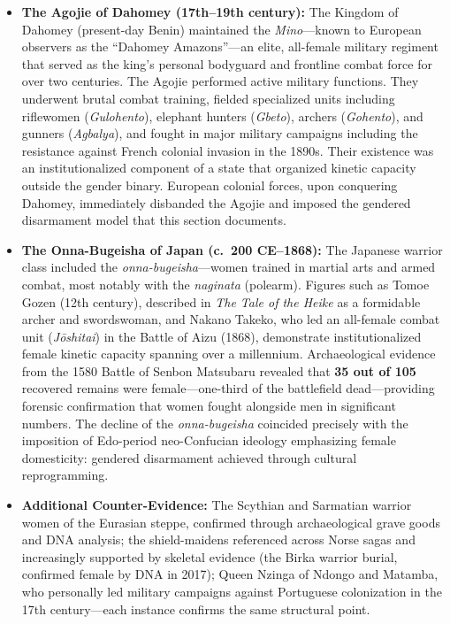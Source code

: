 \begin{itemize}
    \item \textbf{The Agojie of Dahomey (17th--19th century):} The Kingdom of Dahomey (present-day Benin) maintained the \textit{Mino}---known to European observers as the ``Dahomey Amazons''---an elite, all-female military regiment that served as the king's personal bodyguard and frontline combat force for over two centuries. The Agojie performed active military functions. They underwent brutal combat training, fielded specialized units including riflewomen (\textit{Gulohento}), elephant hunters (\textit{Gbeto}), archers (\textit{Gohento}), and gunners (\textit{Agbalya}), and fought in major military campaigns including the resistance against French colonial invasion in the 1890s. Their existence was an institutionalized component of a state that organized kinetic capacity outside the gender binary. European colonial forces, upon conquering Dahomey, immediately disbanded the Agojie and imposed the gendered disarmament model that this section documents.

    \item \textbf{The Onna-Bugeisha of Japan (c.\ 200 CE--1868):} The Japanese warrior class included the \textit{onna-bugeisha}---women trained in martial arts and armed combat, most notably with the \textit{naginata} (polearm). Figures such as Tomoe Gozen (12th century), described in \textit{The Tale of the Heike} as a formidable archer and swordswoman, and Nakano Takeko, who led an all-female combat unit (\textit{J\={o}shitai}) in the Battle of Aizu (1868), demonstrate institutionalized female kinetic capacity spanning over a millennium. Archaeological evidence from the 1580 Battle of Senbon Matsubaru revealed that \textbf{35 out of 105} recovered remains were female---one-third of the battlefield dead---providing forensic confirmation that women fought alongside men in significant numbers. The decline of the \textit{onna-bugeisha} coincided precisely with the imposition of Edo-period neo-Confucian ideology emphasizing female domesticity: gendered disarmament achieved through cultural reprogramming.

    \item \textbf{Additional Counter-Evidence:} The Scythian and Sarmatian warrior women of the Eurasian steppe, confirmed through archaeological grave goods and DNA analysis; the shield-maidens referenced across Norse sagas and increasingly supported by skeletal evidence (the Birka warrior burial, confirmed female by DNA in 2017); Queen Nzinga of Ndongo and Matamba, who personally led military campaigns against Portuguese colonization in the 17th century---each instance confirms the same structural point.
\end{itemize}

